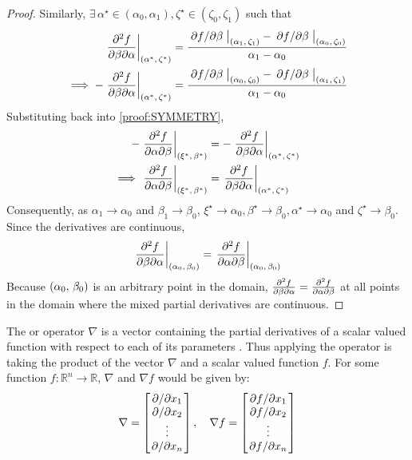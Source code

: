 \begin{theorem}
\begin{proof}
		Similarly, $\exists\,\alpha^\star\in(\alpha_0,\alpha_1),\zeta^\star\in(\zeta_0,\zeta_1)$ such that
		\begin{align*}
			\eval{\pdv{f}{\beta}{\alpha}}_{\point{\alpha^\star}{\zeta^\star}}&=\frac{\eval{\pdv*{f}{\beta}}_{\point{\alpha_1}{\zeta_1}}-\eval{\pdv*{f}{\beta}}_{\point{\alpha_0}{\zeta_0}}}{\alpha_1-\alpha_0}\\
			\implies-\eval{\pdv{f}{\beta}{\alpha}}_{\point{\alpha^\star}{\zeta^\star}}&=\frac{\eval{\pdv*{f}{\beta}}_{\point{\alpha_0}{\zeta_0}}-\eval{\pdv*{f}{\beta}}_{\point{\alpha_1}{\zeta_1}}}{\alpha_1-\alpha_0}
		\end{align*}
		Substituting back into \eqref{proof:SYMMETRY},
		\begin{align*}
			-\eval{\pdv{f}{\alpha}{\beta}}_{\point{\xi^\star}{\beta^\star}}&=-\eval{\pdv{f}{\beta}{\alpha}}_{\point{\alpha^\star}{\zeta^\star}}\\
			\implies\eval{\pdv{f}{\alpha}{\beta}}_{\point{\xi^\star}{\beta^\star}}&=\eval{\pdv{f}{\beta}{\alpha}}_{\point{\alpha^\star}{\zeta^\star}}
		\end{align*}
		Consequently, as $\alpha_1\rightarrow\alpha_0$ and $\beta_1\rightarrow\beta_0$, $\xi^\star\rightarrow\alpha_0,\beta^\star\rightarrow\beta_0,\alpha^\star\rightarrow\alpha_0$ 
		and $\zeta^\star\rightarrow\beta_0$. Since the derivatives are continuous,
		$$
			\eval{\pdv{f}{\beta}{\alpha}}_{\point{\alpha_0}{\beta_0}}=\eval{\pdv{f}{\alpha}{\beta}}_{\point{\alpha_0}{\beta_0}}
		$$
		Because $\left(\alpha_0,\,\beta_0\right)$ is an arbitrary point in the domain, $\pdv{f}{\beta}{\alpha}=\pdv{f}{\alpha}{\beta}$ at 
		all points in the domain where the mixed partial derivatives are continuous.
	\end{proof}
\end{theorem}
\begin{defn}
	The  or  operator $\nabla$ is a vector containing the partial derivatives of a scalar valued function with
	respect to each of its parameters \cite{RAPP2017137}. Thus applying the operator is taking the product of the vector $\nabla$ and a scalar valued
	function $f$. For some function $f:\mathbb{R}^n\rightarrow\mathbb{R}$, $\nabla$ and $\nabla f$ would be given by:
	$$
		\nabla=\begin{bmatrix}
			\pdv*{x_1}\\
			\pdv*{x_2}\\
			\vdots\\
			\pdv*{x_n}
		\end{bmatrix},\quad
		\nabla f=\begin{bmatrix}
			\pdv*{f}{x_1}\\
			\pdv*{f}{x_2}\\
			\vdots\\
			\pdv*{f}{x_n}
		\end{bmatrix}
	$$
\end{defn}

